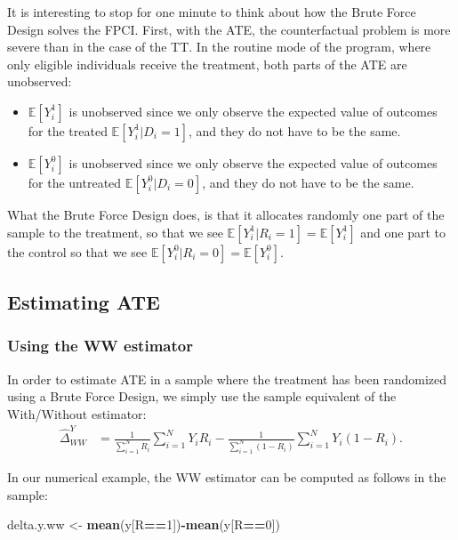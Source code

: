 \documentclass[]{book}
\newenvironment{Shaded}{\begin{snugshade}}{\end{snugshade}}
\newcommand{\DecValTok}[1]{\textcolor[rgb]{0.00,0.00,0.81}{#1}}
\newcommand{\KeywordTok}[1]{\textcolor[rgb]{0.13,0.29,0.53}{\textbf{#1}}}
\newcommand{\NormalTok}[1]{#1}
\newcommand{\OperatorTok}[1]{\textcolor[rgb]{0.81,0.36,0.00}{\textbf{#1}}}
\newcommand{\StringTok}[1]{\textcolor[rgb]{0.31,0.60,0.02}{#1}}
\providecommand{\tightlist}{%
  \setlength{\itemsep}{0pt}\setlength{\parskip}{0pt}}
\newcommand{\esp}[1]{\mathbb{E}[ #1 ]}
\theoremstyle{definition}
\theoremstyle{definition}
\theoremstyle{definition}
\theoremstyle{remark}
\let\BeginKnitrBlock\begin \let\EndKnitrBlock\end
\begin{document}
\BeginKnitrBlock{remark}
\iffalse{} {Remark. } \fi{}It is interesting to stop for one minute to think about how the Brute Force Design solves the FPCI.
First, with the ATE, the counterfactual problem is more severe than in the case of the TT.
In the routine mode of the program, where only eligible individuals receive the treatment, both parts of the ATE are unobserved:
\EndKnitrBlock{remark}

\begin{itemize}
\tightlist
\item
  \(\esp{Y_i^1}\) is unobserved since we only observe the expected value of outcomes for the treated \(\esp{Y_i^1|D_i=1}\), and they do not have to be the same.
\item
  \(\esp{Y_i^0}\) is unobserved since we only observe the expected value of outcomes for the untreated \(\esp{Y_i^0|D_i=0}\), and they do not have to be the same.
\end{itemize}

What the Brute Force Design does, is that it allocates randomly one part of the sample to the treatment, so that we see \(\esp{Y_i^1|R_i=1}=\esp{Y_i^1}\) and one part to the control so that we see \(\esp{Y_i^0|R_i=0}=\esp{Y_i^0}\).

\hypertarget{estimating-ate}{%
\subsection{Estimating ATE}\label{estimating-ate}}

\hypertarget{using-the-ww-estimator}{%
\subsubsection{Using the WW estimator}\label{using-the-ww-estimator}}

In order to estimate ATE in a sample where the treatment has been randomized using a Brute Force Design, we simply use the sample equivalent of the With/Without estimator:
\begin{align*}
  \hat{\Delta}^Y_{WW} & = \frac{1}{\sum_{i=1}^N R_i}\sum_{i=1}^N Y_iR_i-\frac{1}{\sum_{i=1}^N (1-R_i)}\sum_{i=1}^N Y_i(1-R_i).
\end{align*}

\BeginKnitrBlock{example}
\protect\hypertarget{exm:unnamed-chunk-70}{}{\label{exm:unnamed-chunk-70} }In our numerical example, the WW estimator can be computed as follows in the sample:
\EndKnitrBlock{example}

\begin{Shaded}
\begin{Highlighting}[]
\NormalTok{delta.y.ww <-}\StringTok{ }\KeywordTok{mean}\NormalTok{(y[R}\OperatorTok{==}\DecValTok{1}\NormalTok{])}\OperatorTok{-}\KeywordTok{mean}\NormalTok{(y[R}\OperatorTok{==}\DecValTok{0}\NormalTok{])}
\end{Highlighting}
\end{Shaded}
\end{document}
